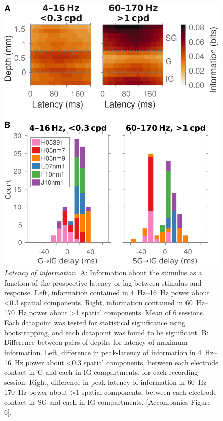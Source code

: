 \begin{figure}
\centering \includegraphics[width=\columnwidth]{paperfigs/figS6}
%
\caption{%
\textit{Latency of information.}
A: Information about the stimulus as a function of the prospective latency or lag between stimulus and response.
Left, information contained in \SIrange{4}{16}{Hz} power about \SI{<0.3}{\cpd} spatial components.
Right, information contained in \SIrange{60}{170}{Hz} power about \SI{>1}{\cpd} spatial components.
Mean of 6 sessions.
Each datapoint was tested for statistical significance using bootstrapping, and each datapoint was found to be significant.
B: Difference between pairs of depths for latency of maximum information.
Left, difference in peak-latency of information in \SIrange{4}{16}{Hz} power about \SI{<0.3}{\cpd} spatial components, between each electrode contact in \ac{G} and each in \ac{IG} compartments, for each recording session.
Right, difference in peak-latency of information in \SIrange{60}{170}{Hz} power about \SI{>1}{\cpd} spatial components, between each electrode contact in \ac{SG} and each in \ac{IG} compartments.
[Accompanies Figure 6].
}
\label{fig:lam_s6}
%
\end{figure}


